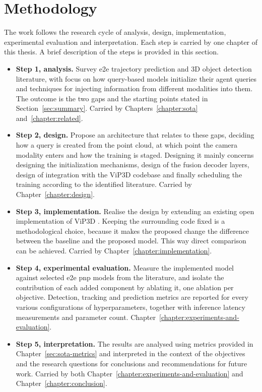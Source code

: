 \section{Methodology}
\label{sec:methodology}

The work follows the research cycle of analysis, design, implementation, experimental evaluation and
interpretation. Each step is carried by one chapter of this thesis. A brief description of the steps 
is provided in this section.

\begin{itemize}
    \item \textbf{Step 1, analysis.} Survey \ac{e2e} trajectory prediction and 3D object detection literature, with focus on 
    how query-based models initialize their agent queries and techniques for injecting information from different modalities into them.
    The outcome is the two gaps and the starting points stated in Section~\ref{sec:summary}. Carried by
    Chapters~\ref{chapter:sota} and~\ref{chapter:related}.

    \item \textbf{Step 2, design.} Propose an architecture that relates to these gaps, deciding how a query is
    created from the point cloud, at which point the camera modality enters and how the training is
    staged. Designing it mainly concerns designing the initialization mechanisms, design of the fusion decoder layers,
    design of integration with the ViP3D codebase and finally scheduling the training according to the 
    identified literature. Carried by Chapter~\ref{chapter:design}.

    \item \textbf{Step 3, implementation.} Realise the design by extending an existing open implementation
    of ViP3D \cite{Gu2023ViP3D}. Keeping the surrounding code
    fixed is a methodological choice, because it makes the proposed change the difference between the
    baseline and the proposed model. This way direct comparison can be achieved.
    Carried by Chapter~\ref{chapter:implementation}.

    \item \textbf{Step 4, experimental evaluation.} Measure the implemented model against selected
    \ac{e2e} \ac{pnp} models from the literature, and isolate the contribution of each added component by
    ablating it, one ablation per objective. Detection, tracking and prediction metrics are reported for
    every various configurations of hyperparameters, together with inference latency measurements and parameter count.
    Chapter~\ref{chapter:experiments-and-evaluation}.

    \item \textbf{Step 5, interpretation.} The results are analysed using metrics provided in
    Chapter~\ref{sec:sota-metrics} and interpreted in the context of 
    the objectives and the research questions for conclusions and recommendations for future work.
    Carried by both Chapter~\ref{chapter:experiments-and-evaluation} and
    Chapter~\ref{chapter:conclusion}.
\end{itemize}

